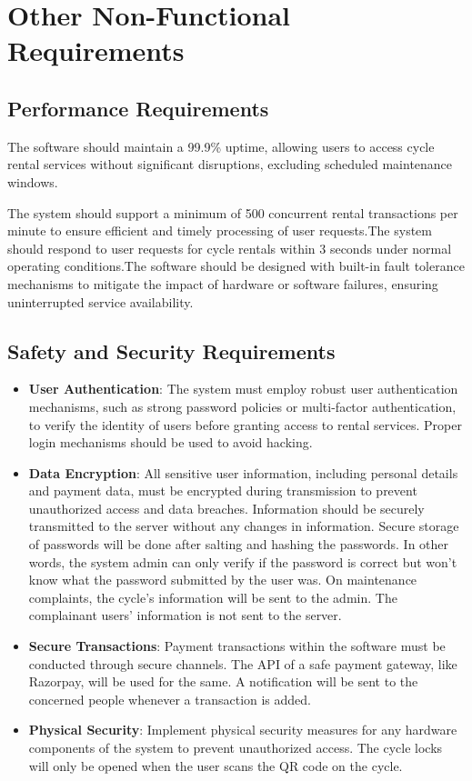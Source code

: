\documentclass{scrreprt}
\begin{document}
\chapter{Other Non-Functional Requirements}
\section{Performance Requirements}
The software should maintain a 99.9\% uptime, allowing users to access cycle rental services without significant disruptions, excluding scheduled maintenance windows.

The system should support a minimum of 500 concurrent rental transactions per minute to ensure efficient and timely processing of user requests.The system should respond to user requests for cycle rentals within 3 seconds under normal operating conditions.The software should be designed with built-in fault tolerance mechanisms to mitigate the impact of hardware or software failures, ensuring uninterrupted service availability.

\section{Safety and Security Requirements}
\begin{itemize}
    \item \textbf{User Authentication}: The system must employ robust user authentication mechanisms, such as strong password policies or multi-factor authentication, to verify the identity of users before granting access to rental services. Proper login mechanisms should be used to avoid hacking.
    \item \textbf{Data Encryption}: All sensitive user information, including personal details and payment data, must be encrypted during transmission to prevent unauthorized access and data breaches. Information should be securely transmitted to the server without any changes in information. Secure storage of passwords will be done after salting and hashing the passwords. In other words, the system admin can only verify if the password is correct but won’t know what the password submitted by the user was. On maintenance complaints, the cycle’s information will be sent to the admin. The complainant users’ information is not sent to the server.
    \item \textbf{Secure Transactions}: Payment transactions within the software must be conducted through secure channels. The API of a safe payment gateway, like Razorpay, will be used for the same. A notification will be sent to the concerned people whenever a transaction is added.
    \item \textbf{Physical Security}: Implement physical security measures for any hardware components of the system to prevent unauthorized access. The cycle locks will only be opened when the user scans the QR code on the cycle.
\end{itemize}
\end{document}
